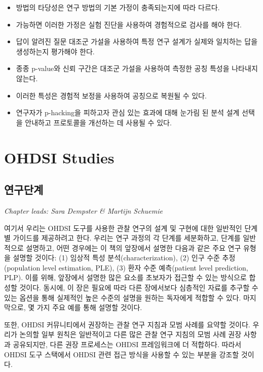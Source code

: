 \documentclass[11pt]{book}
\theoremstyle{definition}
\theoremstyle{definition}
\theoremstyle{definition}
\theoremstyle{remark}
\let\BeginKnitrBlock\begin \let\EndKnitrBlock\end
\begin{document}
\BeginKnitrBlock{rmdsummary}
\begin{itemize}
\item
  방법의 타당성은 연구 방법의 기본 가정이 충족되는지에 따라 다르다.
\item
  가능하면 이러한 가정은 실험 진단을 사용하여 경험적으로 검사를 해야
  한다.
\item
  답이 알려진 질문 대조군 가설을 사용하여 특정 연구 설계가 실제와
  일치하는 답을 생성하는지 평가해야 한다.
\item
  종종 p-value와 신뢰 구간은 대조군 가설을 사용하여 측정한 공칭 특성을
  나타내지 않는다.
\item
  이러한 특성은 경험적 보정을 사용하여 공칭으로 복원될 수 있다.
\item
  연구자가 p-hacking을 피하고자 관심 있는 효과에 대해 눈가림 된 분석
  설계 선택을 안내하고 프로토콜을 개선하는 데 사용될 수 있다.
\end{itemize}
\EndKnitrBlock{rmdsummary}

\part{OHDSI Studies}\label{part-ohdsi-studies}

\chapter{연구단계}\label{StudySteps}

\emph{Chapter leads: Sara Dempster \& Martijn Schuemie}

여기서 우리는 OHDSI 도구를 사용한 관찰 연구의 설계 및 구현에 대한
일반적인 단계별 가이드를 제공하려고 한다. 우리는 연구 과정의 각 단계를
세분화하고, 단계를 일반적으로 설명하고, 어떤 경우에는 이 책의 앞장에서
설명한 다음과 같은 주요 연구 유형을 설명할 것이다: (1) 임상적 특성
분석(characterization), (2) 인구 수준 추정(population level estimation,
PLE), (3) 환자 수준 예측(patient level prediction, PLP). 이를 위해,
앞장에서 설명한 많은 요소를 초보자가 접근할 수 있는 방식으로 합성할
것이다. 동시에, 이 장은 필요에 따라 다른 장에서보다 심층적인 자료를
추구할 수 있는 옵션을 통해 실제적인 높은 수준의 설명을 원하는 독자에게
적합할 수 있다. 마지막으로, 몇 가지 주요 예를 통해 설명할 것이다.

또한, OHDSI 커뮤니티에서 권장하는 관찰 연구 지침과 모범 사례를 요약할
것이다. 우리가 논의할 일부 원칙은 일반적이고 다른 많은 관찰 연구 지침의
모범 사례 권장 사항과 공유되지만, 다른 권장 프로세스는 OHDSI
프레임워크에 더 적합하다. 따라서 OHDSI 도구 스택에서 OHDSI 관련 접근
방식을 사용할 수 있는 부분을 강조할 것이다.
\end{document}
